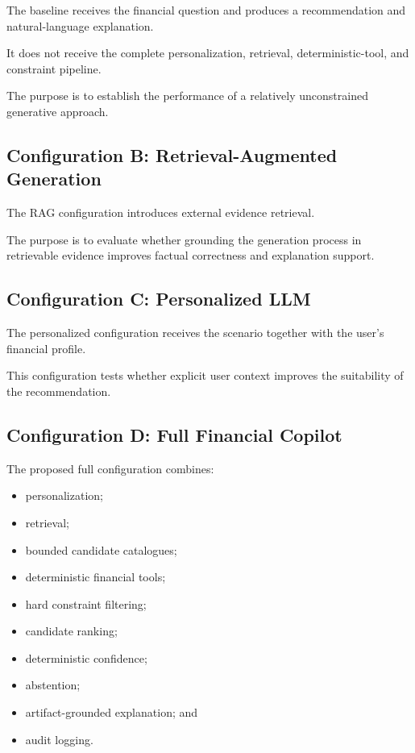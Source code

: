 \documentclass[12pt,a4paper]{article}
\begin{document}
The baseline receives the financial question and produces a recommendation and natural-language explanation.

It does not receive the complete personalization, retrieval, deterministic-tool, and constraint pipeline.

The purpose is to establish the performance of a relatively unconstrained generative approach.

\subsection{Configuration B: Retrieval-Augmented Generation}

The RAG configuration introduces external evidence retrieval.

The purpose is to evaluate whether grounding the generation process in retrievable evidence improves factual correctness and explanation support.

\subsection{Configuration C: Personalized LLM}

The personalized configuration receives the scenario together with the user's financial profile.

This configuration tests whether explicit user context improves the suitability of the recommendation.

\subsection{Configuration D: Full Financial Copilot}

The proposed full configuration combines:
\begin{itemize}
    \item personalization;
    \item retrieval;
    \item bounded candidate catalogues;
    \item deterministic financial tools;
    \item hard constraint filtering;
    \item candidate ranking;
    \item deterministic confidence;
    \item abstention;
    \item artifact-grounded explanation; and
    \item audit logging.
\end{itemize}
\end{document}
